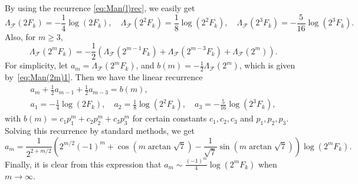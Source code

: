 \documentclass[11pt, a4paper]{article}
\newcommand{\manF}{\Lambda_{\mathcal{F}}}
\theoremstyle{plain}
\theoremstyle{definition}
\begin{document}
By using the recurrence \eqref{eq:Man(l)rec}, we easily get
\[
\manF(2F_k) = -\frac{1}{4} \log(2F_k),
\quad
\manF(2^2F_k) = \frac{1}{8} \log(2^2F_k),
\quad
\manF(2^3F_k) = -\frac{5}{16} \log(2^3F_k).
\]
Also, for $m \ge 3$,
\[
\manF(2^mF_k) = -\frac{1}{2} \left( \manF(2^{m-1}F_k)
+ \manF(2^{m-3}F_k) + \manF(2^{m}) \right).
\]
For simplicity, let $a_m = \manF(2^mF_k)$, and $b(m) = -\frac{1}{2}\manF(2^{m})$, which is given by~\eqref{eq:Man(2m)1}. Then we have the linear recurrence
\begin{equation*}
\begin{gathered}
a_m + \frac{1}{2} a_{m-1} + \frac{1}{2} a_{m-3} = b(m),
\\
a_1 = -\frac{1}{4} \log(2F_k),
\quad
a_2 = \frac{1}{8} \log(2^2F_k),
\quad
a_3 = -\frac{5}{16} \log(2^3F_k),
\end{gathered}
\end{equation*}
with $b(m) = c_1 p_1^m + c_2 p_2^m + c_3 p_3^m$
for certain constants $c_1,c_2,c_3$ and $p_1,p_2,p_3$.
Solving this recurrence by standard methods, we get
\[
a_m = \frac{1}{2^{2+m/2}} \left(2^{m/2}(-1)^m + \cos(m \arctan\sqrt{7}) 
  - \frac{1}{\sqrt{7}} \sin(m \arctan\sqrt{7}) \right) \log(2^mF_k).
\]
Finally, it is clear from this expression that 
$a_m \sim \frac{(-1)^m}{4} \log(2^mF_k)$ when $m \to \infty$.
\end{document}
